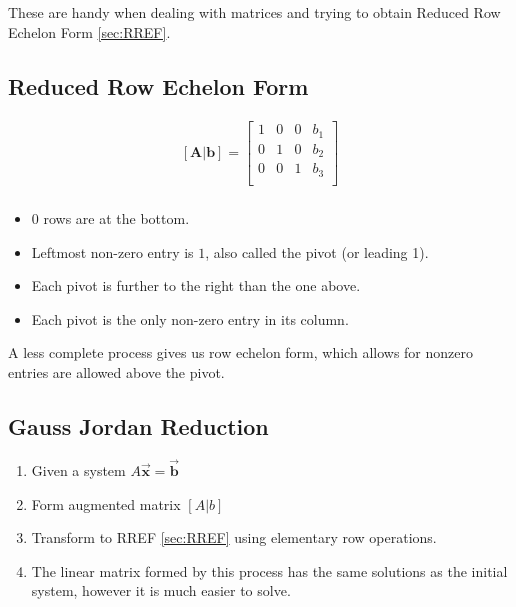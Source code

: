 \documentclass[12pt,landscape,twocolumn]{article}
\let\oldvec\vec
\renewcommand{\vec}[1]{\oldvec{\mathbf{ #1 } } }                    %
\begin{document}
    These are handy when dealing with matrices and trying to obtain Reduced Row Echelon Form \eqref{sec:RREF}.

    \subsection{Reduced Row Echelon Form}\label{sec:RREF}
    \begin{equation}\label{eq:rref}
    \begin{aligned}
        \mathbf{[A|b]}=
        \left[\begin{array}{ccc|c}
        1 & 0 & 0 & b_1\\
        0 & 1 & 0 & b_2\\
        0 & 0 & 1 & b_3\\
        \end{array}\right]\\
    \end{aligned}
    \end{equation}

    \begin{itemize}
        \item $0$ rows are at the bottom.
        \item Leftmost non-zero entry is $1$, also called the pivot (or leading 1).
        \item Each pivot is further to the right than the one above.
        \item Each pivot is the only non-zero entry in its column.
    \end{itemize}

    A less complete process gives us row echelon form, which allows for nonzero entries are allowed above the pivot.

    \subsection{Gauss Jordan Reduction}
    \begin{enumerate}
        \item Given a system $A\vec{x} = \vec{b}$
        \item Form augmented matrix $[A|b]$
        \item Transform to RREF \eqref{sec:RREF} using elementary row operations.
        \item The linear matrix formed by this process has the same solutions as the initial system, however it is much easier to solve.
    \end{enumerate}
\end{document}
